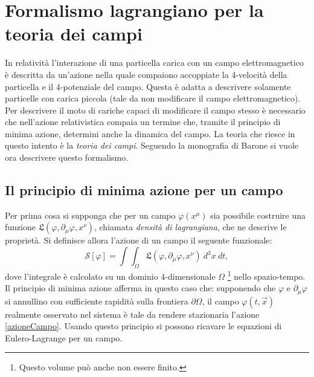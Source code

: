 \section{Formalismo lagrangiano per la teoria dei campi}
In relatività l'interazione di una particella carica con un campo elettromagnetico è descritta da un'azione nella quale compaiono accoppiate la 4-velocità della particella e il 4-potenziale del campo. Questa è adatta a descrivere solamente particelle con carica piccola (tale da non modificare il campo elettromagnetico). Per descrivere il moto di cariche capaci di modificare il campo stesso è necessario che nell'azione relativistica compaia un termine che, tramite il principio di minima azione, determini anche la dinamica del campo. La teoria che riesce in questo intento è la \emph{teoria dei campi}.
\label{sec:lagCampi}
Seguendo la monografia di Barone \cite{Barone} si vuole ora descrivere questo formalismo.
\subsection{Il principio di minima azione per un campo}
Per prima cosa si supponga che per un campo $\varphi(x^\mu)$ sia possibile costruire una funzione $\mathfrak{L}(\varphi,\partial_\mu\varphi,x^\nu)$, chiamata \emph{densità di lagrangiana}, che ne descrive le proprietà.
Si definisce allora l'azione di un campo il seguente funzionale:
\begin{equation}
    \mathcal{S}[\varphi]=\int\int_{\Omega}\mathfrak{L}(\varphi,\partial_\mu\varphi,x^\nu)\ d^3x\ dt,\label{azioneCampo}
\end{equation}
dove l'integrale è calcolato su un dominio 4-dimensionale $\Omega$ \footnote{Questo volume può anche non essere finito.} nello spazio-tempo.\\
Il principio di minima azione afferma in questo caso che: supponendo che $\varphi$ e $\partial_\mu\varphi$ si annullino con sufficiente rapidità sulla frontiera $\partial\Omega$, il campo $\varphi(t,\vec x)$ realmente osservato nel sistema è tale da rendere stazionaria l'azione \eqref{azioneCampo}. Usando questo principio si possono ricavare le equazioni di Eulero-Lagrange per un campo.\\

